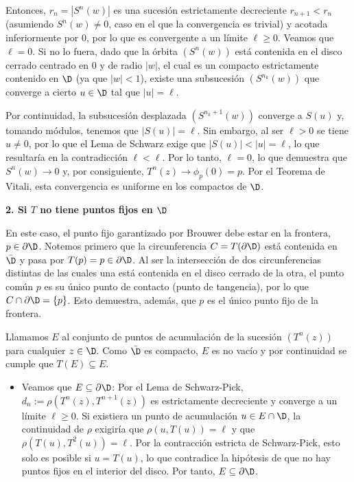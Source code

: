 Entonces, $r_n=|S^n(w)|$ es una sucesión estrictamente decreciente $r_{n+1} < r_n$ (asumiendo $S^n(w) \neq 0$, caso en el que la convergencia es trivial) y acotada inferiormente por $0$, por lo que es convergente a un límite $\ell \geq 0$. Veamos que $\ell=0$. Si no lo fuera, dado que la órbita $(S^n(w))$ está contenida en el disco cerrado centrado en $0$ y de radio $|w|$, el cual es un compacto estrictamente contenido en $\D$ (ya que $|w| < 1$), existe una subsucesión $(S^{n_k}(w))$ que converge a cierto $u \in \D$ tal que $|u| = \ell$.

Por continuidad, la subsucesión desplazada $(S^{n_k+1}(w))$ converge a $S(u)$ y, tomando módulos, tenemos que $|S(u)|=\ell$. Sin embargo, al ser $\ell > 0$ se tiene $u \neq 0$, por lo que el Lema de Schwarz exige que $|S(u)| < |u| = \ell$, lo que resultaría en la contradicción $\ell < \ell$. Por lo tanto, $\ell=0$, lo que demuestra que $S^n(w) \to 0$ y, por consiguiente, $T^n(z) \to \phi_p(0) = p$. Por el Teorema de Vitali, esta convergencia es uniforme en los compactos de $\D$.

\medskip

\noindent \textbf{2. Si $T$ no tiene puntos fijos en $\D$}

\medskip 

En este caso, el punto fijo garantizado por Brouwer debe estar en la frontera, $p \in \partial \D$. Notemos primero que la circunferencia $C = T(\partial \D)$ está contenida en $\bar{\D}$ y pasa por $T(p)=p \in \partial \D$. Al ser la intersección de dos circunferencias distintas de las cuales una está contenida en el disco cerrado de la otra, el punto común $p$ es su único punto de contacto (punto de tangencia), por lo que $C \cap \partial \D = \{p\}$. Esto demuestra, además, que $p$ es el único punto fijo de la frontera.

Llamamos $E$ al conjunto de puntos de acumulación de la sucesión $(T^n(z))$ para cualquier $z \in \D$. Como $\bar{\D}$ es compacto, $E$ es no vacío y por continuidad se cumple que $T(E) \subseteq E$. 

\begin{itemize}
    \item Veamos que $E \subseteq \partial \D$: Por el Lema de Schwarz-Pick, $d_n := \rho(T^n(z), T^{n+1}(z))$ es estrictamente decreciente y converge a un límite $\ell \geq 0$. Si existiera un punto de acumulación $u \in E \cap \D$, la continuidad de $\rho$ exigiría que $\rho(u, T(u)) = \ell$ y que $\rho(T(u), T^2(u)) = \ell$. Por la contracción estricta de Schwarz-Pick, esto solo es posible si $u = T(u)$, lo que contradice la hipótesis de que no hay puntos fijos en el interior del disco. Por tanto, $E \subseteq \partial \D$.
\end{itemize}

